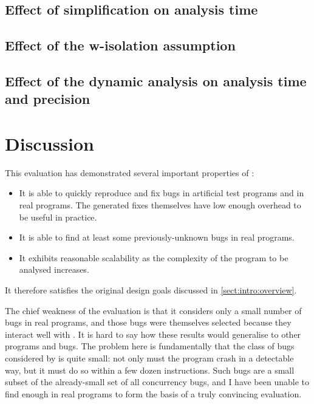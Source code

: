 \subsection{Effect of {\StateMachine} simplification on analysis time}


\subsection{Effect of the \gls{w-isolation} assumption}

\subsection{Effect of the dynamic analysis on analysis time and precision}

\section{Discussion}

This evaluation has demonstrated several important properties of
{\technique}:
\begin{itemize}
\item It is able to quickly reproduce and fix bugs in artificial test
  programs and in real programs.  The generated fixes themselves have
  low enough overhead to be useful in practice.
\item It is able to find at least some previously-unknown bugs in real
  programs.
\item It exhibits reasonable scalability as the complexity of the
  program to be analysed increases.
\end{itemize}
It therefore satisfies the original design goals discussed in
\autoref{sect:intro:overview}.

The chief weakness of the evaluation is that it considers only a small
number of bugs in real programs, and those bugs were themselves
selected because they interact well with {\technique}.  It is hard to
say how these results would generalise to other programs and bugs.
The problem here is fundamentally that the class of bugs considered by
{\technique} is quite small: not only must the program crash in a
detectable way, but it must do so within a few dozen instructions.
Such bugs are a small subset of the already-small set of all
concurrency bugs, and I have been unable to find enough in real
programs to form the basis of a truly convincing evaluation.

